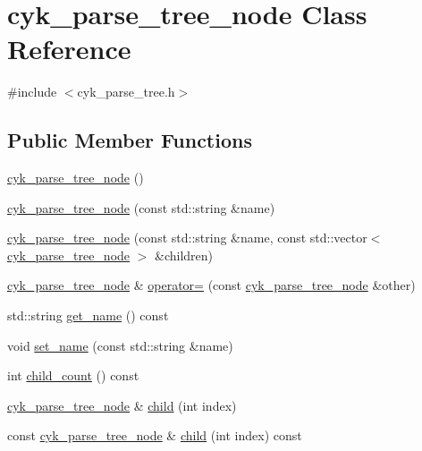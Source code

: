 \hypertarget{classcyk__parse__tree__node}{}\section{cyk\+\_\+parse\+\_\+tree\+\_\+node Class Reference}
\label{classcyk__parse__tree__node}


{\ttfamily \#include $<$cyk\+\_\+parse\+\_\+tree.\+h$>$}

\subsection*{Public Member Functions}
\begin{DoxyCompactItemize}
\item 
\mbox{\hyperlink{classcyk__parse__tree__node_aec49342697d8a2d6eec71ed65a02c11e}{cyk\+\_\+parse\+\_\+tree\+\_\+node}} ()
\item 
\mbox{\hyperlink{classcyk__parse__tree__node_a8abcbe5d43d33c94f05dfa9e5bbd960b}{cyk\+\_\+parse\+\_\+tree\+\_\+node}} (const std\+::string \&name)
\item 
\mbox{\hyperlink{classcyk__parse__tree__node_a20adb06b40d65e9de1e661eb29c1582c}{cyk\+\_\+parse\+\_\+tree\+\_\+node}} (const std\+::string \&name, const std\+::vector$<$ \mbox{\hyperlink{classcyk__parse__tree__node}{cyk\+\_\+parse\+\_\+tree\+\_\+node}} $>$ \&children)
\item 
\mbox{\hyperlink{classcyk__parse__tree__node}{cyk\+\_\+parse\+\_\+tree\+\_\+node}} \& \mbox{\hyperlink{classcyk__parse__tree__node_a35eaca957a6874821c0899539b14d9f1}{operator=}} (const \mbox{\hyperlink{classcyk__parse__tree__node}{cyk\+\_\+parse\+\_\+tree\+\_\+node}} \&other)
\item 
std\+::string \mbox{\hyperlink{classcyk__parse__tree__node_af00f172bdcce590c066d408db94148e0}{get\+\_\+name}} () const
\item 
void \mbox{\hyperlink{classcyk__parse__tree__node_aec106b63ae6859480875ba5edf33e347}{set\+\_\+name}} (const std\+::string \&name)
\item 
int \mbox{\hyperlink{classcyk__parse__tree__node_aefb9b424e58a670b1ac368fcf86b7512}{child\+\_\+count}} () const
\item 
\mbox{\hyperlink{classcyk__parse__tree__node}{cyk\+\_\+parse\+\_\+tree\+\_\+node}} \& \mbox{\hyperlink{classcyk__parse__tree__node_a5b8c50139dff519bde5eaea7038a6908}{child}} (int index)
\item 
const \mbox{\hyperlink{classcyk__parse__tree__node}{cyk\+\_\+parse\+\_\+tree\+\_\+node}} \& \mbox{\hyperlink{classcyk__parse__tree__node_a0bb50917b8d92e1d2f7a4748612d2f6e}{child}} (int index) const

\end{DoxyCompactItemize}

